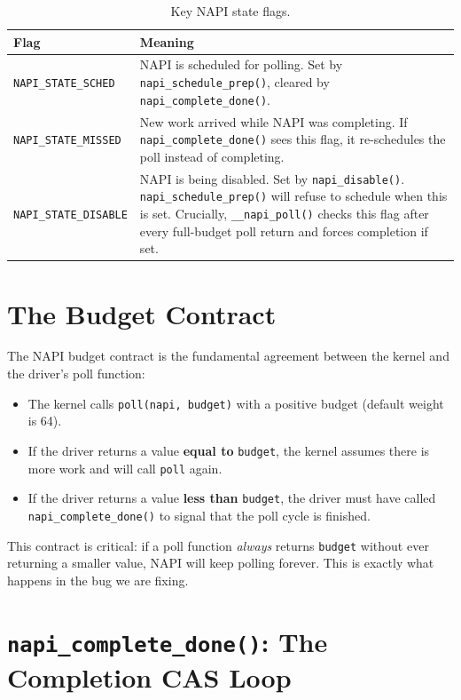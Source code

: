 \documentclass[11pt,a4paper,openany]{book}
\newcommand{\func}[1]{\texttt{#1()}}
\newcommand{\flag}[1]{\texttt{#1}}
\begin{document}
\begin{table}[H]
\centering
\begin{tabular}{lp{10cm}}
\toprule
\textbf{Flag} & \textbf{Meaning} \\
\midrule
\flag{NAPI\_STATE\_SCHED} &
    NAPI is scheduled for polling.  Set by \func{napi\_schedule\_prep},
    cleared by \func{napi\_complete\_done}.  \\
\flag{NAPI\_STATE\_MISSED} &
    New work arrived while NAPI was completing.  If
    \func{napi\_complete\_done} sees this flag, it re-schedules the
    poll instead of completing.  \\
\flag{NAPI\_STATE\_DISABLE} &
    NAPI is being disabled.  Set by \func{napi\_disable}.
    \func{napi\_schedule\_prep} will refuse to schedule when this is set.
    Crucially, \func{\_\_napi\_poll} checks this flag after every
    full-budget poll return and forces completion if set.  \\
\bottomrule
\end{tabular}
\caption{Key NAPI state flags.}
\label{tab:napi-flags}
\end{table}

\section{The Budget Contract}
\label{sec:budget-contract}

The NAPI budget contract is the fundamental agreement between the kernel
and the driver's poll function:

\begin{itemize}
\item The kernel calls \texttt{poll(napi, budget)} with a positive
    budget (default weight is 64).
\item If the driver returns a value \textbf{equal to} \texttt{budget},
    the kernel assumes there is more work and will call \texttt{poll}
    again.
\item If the driver returns a value \textbf{less than} \texttt{budget},
    the driver must have called \func{napi\_complete\_done} to signal
    that the poll cycle is finished.
\end{itemize}

This contract is critical: if a poll function \emph{always} returns
\texttt{budget} without ever returning a smaller value, NAPI will keep
polling forever.  This is exactly what happens in the bug we are fixing.

\section{\texttt{napi\_complete\_done()}: The Completion CAS Loop}
\label{sec:napi-complete-done}
\end{document}
